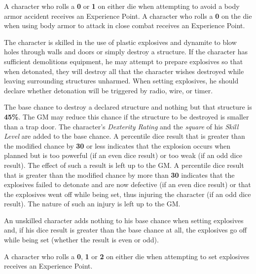 A character who rolls a \textbf{0} or \textbf{1} on either die when
attempting to avoid a body armor accident receives an Experience
Point.  A character who rolls a \textbf{0} on the die when using body
armor to attack in close combat receives an Experience Point.

\label{sec:skill-demolitions}

The character is skilled in the use of plastic explosives and dynamite
to blow holes through walls and doors or simply destroy a structure.
If the character has sufficient demolitions equipment, he may attempt
to prepare explosives so that when detonated, they will destroy all
that the character wishes destroyed while leaving surrounding
structures unharmed.  When setting explosives, he should declare
whether detonation will be triggered by radio, wire, or timer.

The base chance to destroy a declared structure and nothing but that
structure is \textbf{45\%}.  The GM may reduce this chance if the
structure to be destroyed is smaller than a trap door.  The character's
\emph{Dexterity Rating} and the \emph{square} of his \emph{Skill
  Level} are added to the base chance.  A percentile dice result that
is greater than the modified chance by \textbf{30} or less indicates
that the explosion occurs when planned but is too powerful (if an even
dice result) or too weak (if an odd dice result).  The effect of such a
result is left up to the GM.  A percentile dice result that is greater
than the modified chance by more than \textbf{30} indicates that the
explosives failed to detonate and are now defective (if an even dice
result) or that the explosives went off while being set, thus injuring
the character (if an odd dice result).  The nature of such an injury is
left up to the GM.

An unskilled character adds nothing to his base chance when setting
explosives and, if his dice result is greater than the base chance at
all, the explosives go off while being set (whether the result is even
or odd).

A character who rolls a \textbf{0}, \textbf{1} or \textbf{2} on either
die when attempting to set explosives receives an Experience Point.



